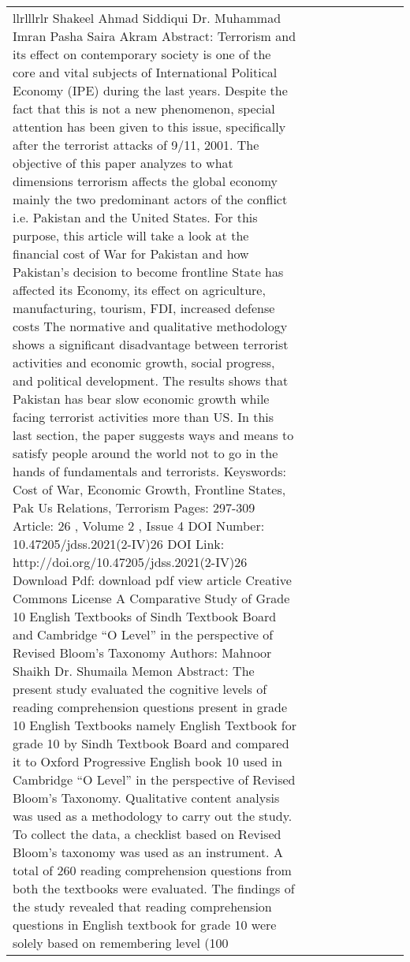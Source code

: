 \begin{longtable}{lllllllll}{llrlllrlr}
Shakeel Ahmad Siddiqui Dr. Muhammad Imran Pasha Saira Akram Abstract:	Terrorism and its effect on contemporary society is one of the core and vital subjects of International Political Economy (IPE) during the last years. Despite the fact that this is not a new phenomenon, special attention has been given to this issue, specifically after the terrorist attacks of 9/11, 2001. The objective of this paper analyzes to what dimensions terrorism affects the global economy mainly the two predominant actors of the conflict i.e. Pakistan and the United States. For this purpose, this article will take a look at the financial cost of War for Pakistan and how Pakistan’s decision to become frontline State has affected its Economy, its effect on agriculture, manufacturing, tourism, FDI, increased defense costs The normative and qualitative methodology shows a significant disadvantage between terrorist activities and economic growth, social progress, and political development. The results shows that Pakistan has bear slow economic growth while facing terrorist activities more than US. In this last section, the paper suggests ways and means to satisfy people around the world not to go in the hands of fundamentals and terrorists. Keyswords:	Cost of War, Economic Growth, Frontline States, Pak Us Relations, Terrorism Pages:	297-309 Article:	26 , Volume 2 , Issue 4 DOI Number:	10.47205/jdss.2021(2-IV)26 DOI Link:	http://doi.org/10.47205/jdss.2021(2-IV)26 Download Pdf:	 download pdf  view article Creative Commons License A Comparative Study of Grade 10 English Textbooks of Sindh Textbook Board and Cambridge “O Level” in the perspective of Revised Bloom’s Taxonomy Authors:	 Mahnoor Shaikh Dr. Shumaila Memon Abstract:	The present study evaluated the cognitive levels of reading comprehension questions present in grade 10 English Textbooks namely English Textbook for grade 10 by Sindh Textbook Board and compared it to Oxford Progressive English book 10 used in Cambridge “O Level” in the perspective of Revised Bloom’s Taxonomy. Qualitative content analysis was used as a methodology to carry out the study. To collect the data, a checklist based on Revised Bloom’s taxonomy was used as an instrument. A total of 260 reading comprehension questions from both the textbooks were evaluated. The findings of the study revealed that reading comprehension questions in English textbook for grade 10 were solely based on remembering level (100%
\end{longtable}
